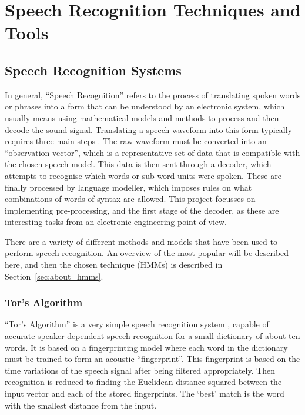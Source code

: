 \chapter{Speech Recognition Techniques and Tools} %
\label{cha:background}


\section{Speech Recognition Systems} %
\label{sec:speech_recognition_systems}
	In general, ``Speech Recognition'' refers to the process of translating spoken words or phrases into a form that can be understood by an electronic system, which usually means using mathematical models and methods to process and then decode the sound signal.  Translating a speech waveform into this form typically requires three main steps \cite{melnikoff2003speech}.  The raw waveform must be converted into an ``observation vector'', which is a representative set of data that is compatible with the chosen speech model.  This data is then sent through a decoder, which attempts to recognise which words or sub-word units were spoken.  These are finally processed by language modeller, which imposes rules on what combinations of words of syntax are allowed.  This project focusses on implementing pre-processing, and the first stage of the decoder, as these are interesting tasks from an electronic engineering point of view.

	There are a variety of different methods and models that have been used to perform speech recognition.  An overview of the most popular will be described here, and then the chosen technique (HMMs) is described in Section~\ref{sec:about_hmms}.

	\subsection{Tor's Algorithm} %
	\label{sub:tors_algorithm}
		``Tor's Algorithm'' is a very simple speech recognition system \cite{tor2003}, capable of accurate speaker dependent speech recognition for a small dictionary of about ten words.  It is based on a fingerprinting model where each word in the dictionary must be trained to form an acoustic ``fingerprint''.  This fingerprint is based on the time variations of the speech signal after being filtered appropriately.  Then recognition is reduced to finding the Euclidean distance squared between the input vector and each of the stored fingerprints.  The `best' match is the word with the smallest distance from the input.
		
